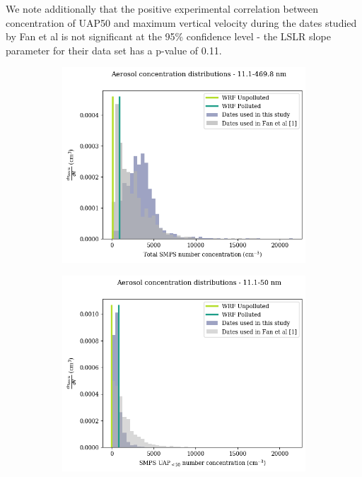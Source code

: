 \documentclass{article}
\begin{document}
We note additionally that the positive experimental correlation between concentration of UAP50 and maximum vertical velocity during the dates studied by Fan et al is not significant at the 95\% confidence level - the LSLR slope parameter for their data set has a p-value of 0.11.
\begin{figure}[ht]
	\centering
	\begin{subfigure}{0.7\textwidth}
		\includegraphics[width=\textwidth]{goama/v1_FINAL_tot_compare_nconc_hist_alldates_figure.png}
		\label{goamazontothist}
		\caption{}
	\end{subfigure}
	\begin{subfigure}{0.7\textwidth}
		\includegraphics[width=\textwidth]{goama/v1_FINAL_uap50_compare_nconc_hist_alldates_figure.png}

\end{subfigure}
\end{figure}
\end{document}

